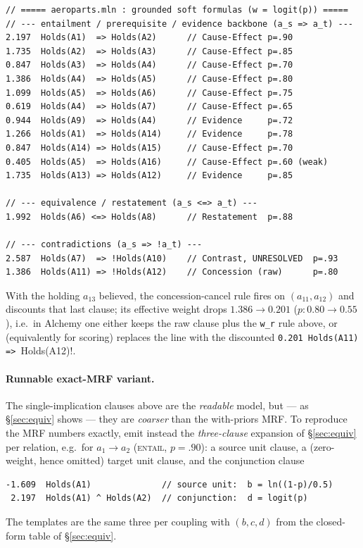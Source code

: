 \documentclass[11pt]{article}
\newcommand{\Ent}{\textsc{entail}}
\begin{document}
\begin{lstlisting}[style=mln]
// ===== aeroparts.mln : grounded soft formulas (w = logit(p)) =====
// --- entailment / prerequisite / evidence backbone (a_s => a_t) ---
2.197  Holds(A1)  => Holds(A2)      // Cause-Effect p=.90
1.735  Holds(A2)  => Holds(A3)      // Cause-Effect p=.85
0.847  Holds(A3)  => Holds(A4)      // Cause-Effect p=.70
1.386  Holds(A4)  => Holds(A5)      // Cause-Effect p=.80
1.099  Holds(A5)  => Holds(A6)      // Cause-Effect p=.75
0.619  Holds(A4)  => Holds(A7)      // Cause-Effect p=.65
0.944  Holds(A9)  => Holds(A4)      // Evidence     p=.72
1.266  Holds(A1)  => Holds(A14)     // Evidence     p=.78
0.847  Holds(A14) => Holds(A15)     // Cause-Effect p=.70
0.405  Holds(A5)  => Holds(A16)     // Cause-Effect p=.60 (weak)
1.735  Holds(A13) => Holds(A12)     // Evidence     p=.85

// --- equivalence / restatement (a_s <=> a_t) ---
1.992  Holds(A6) <=> Holds(A8)      // Restatement  p=.88

// --- contradictions (a_s => !a_t) ---
2.587  Holds(A7)  => !Holds(A10)    // Contrast, UNRESOLVED  p=.93
1.386  Holds(A11) => !Holds(A12)    // Concession (raw)      p=.80
\end{lstlisting}

\noindent With the holding $a_{13}$ believed, the concession-cancel rule fires on
$(a_{11},a_{12})$ and discounts that last clause; its effective weight drops
$1.386\!\to\!0.201$ ($p:0.80\!\to\!0.55$), i.e.\ in Alchemy one either keeps the raw clause
plus the \lstinline[style=mln]!w_r! rule above, or (equivalently for scoring) replaces the
line with the discounted \lstinline[style=mln]!0.201 Holds(A11) => !Holds(A12)!.

\paragraph{Runnable exact-MRF variant.} The single-implication clauses above are the
\emph{readable} model, but --- as \S\ref{sec:equiv} shows --- they are \emph{coarser} than
the with-priors MRF. To reproduce the MRF numbers exactly, emit instead the
\emph{three-clause} expansion of \S\ref{sec:equiv} per relation, e.g.\ for $a_1\!\to\!a_2$
(\Ent{}, $p{=}.90$): a source unit clause, a (zero-weight, hence omitted) target unit clause,
and the conjunction clause
\begin{lstlisting}[style=mln]
-1.609  Holds(A1)              // source unit:  b = ln((1-p)/0.5)
 2.197  Holds(A1) ^ Holds(A2)  // conjunction:  d = logit(p)
\end{lstlisting}
The templates are the same three per coupling with $(b,c,d)$ from the closed-form table of
\S\ref{sec:equiv}.
\end{document}
